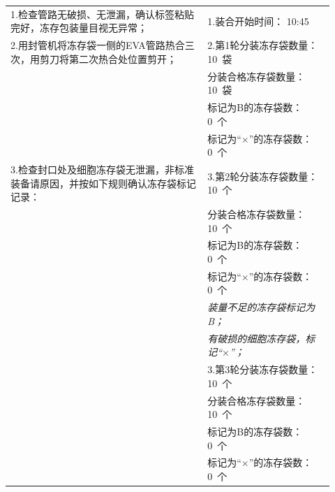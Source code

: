 \documentclass[UTF8,10pt,a4paper,fontset=fandol]{ctexart}
\newcommand{\fieldvalue}[1]{#1}
\newcommand{\handwritten}[1]{#1}
\begin{document}
\begin{center}
\small
\begin{tabular}{|p{0.56\linewidth}|p{0.36\linewidth}|}
\hline
1.检查管路无破损、无泄漏，确认标签粘贴完好，冻存包装量目视无异常；&
1.装合开始时间：
\fieldvalue{\handwritten{10:45}}\\[2pt]
2.用封管机将冻存袋一侧的EVA管路热合三次，用剪刀将第二次热合处位置剪开；&
2.第1轮分装冻存袋数量：
\fieldvalue{\handwritten{10}}\ 袋\\
& 分装合格冻存袋数量：
\fieldvalue{\handwritten{10}}\ 袋\\
& 标记为B的冻存袋数：
\fieldvalue{\handwritten{0}}\ 个\\
& 标记为“$\times$”的冻存袋数：
\fieldvalue{\handwritten{0}}\ 个\\[2pt]
3.检查封口处及细胞冻存袋无泄漏，非标准装备请原因，并按如下规则确认冻存袋标记记录：&
3.第2轮分装冻存袋数量：
\fieldvalue{\handwritten{10}}\ 个\\
& 分装合格冻存袋数量：
\fieldvalue{\handwritten{10}}\ 个\\
& 标记为B的冻存袋数：
\fieldvalue{\handwritten{0}}\ 个\\
& 标记为“$\times$”的冻存袋数：
\fieldvalue{\handwritten{0}}\ 个\\
& \textit{装量不足的冻存袋标记为B；}\\
& \textit{有破损的细胞冻存袋，标记“$\times$”；}\\[2pt]
& 3.第3轮分装冻存袋数量：
\fieldvalue{\handwritten{10}}\ 个\\
& 分装合格冻存袋数量：
\fieldvalue{\handwritten{10}}\ 个\\
& 标记为B的冻存袋数：
\fieldvalue{\handwritten{0}}\ 个\\
& 标记为“$\times$”的冻存袋数：
\fieldvalue{\handwritten{0}}\ 个\\
\hline
\end{tabular}
\end{center}
\end{document}
